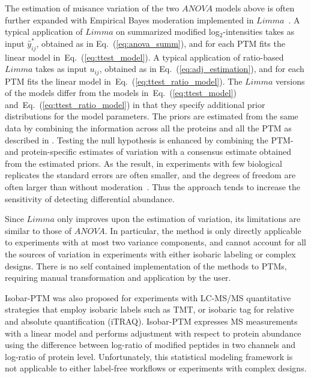 \documentclass[mcp]{article}
\numberwithin{table}{section}
\def\eqref#1{Eq.~(\ref{eq:#1})}
\begin{document}
\medskip \noindent The estimation of nuisance variation of the two $ANOVA$ models above is often further expanded with Empirical Bayes moderation implemented in $Limma$~\cite{ Ritchie_15a, Schwammle2015, Smyth:2004, Smyth:2005, Zhu,Chappell:2021}. 
A typical application of $Limma$ on summarized modified log$_2$-intensities takes as input $\hat{y}^*_{ij}$, obtained as in \eqref{anova_summ}, and for each PTM fits the linear model in~\eqref{ttest_model}. 
A typical application of ratio-based $Limma$ takes as input $u_{ij}$, obtained as in \eqref{adj_estimation}, and for each PTM fits the linear model in~\eqref{ttest_ratio_model}. 
The $Limma$ versions of the models differ from the models in~\eqref{ttest_model} and~\eqref{ttest_ratio_model} in that they specify additional prior distributions for the model parameters. 
The priors are estimated from the same data by combining the information across all the proteins and all the PTM as described in \cite{Smyth:2004}. 
Testing the null hypothesis is enhanced by combining the PTM- and protein-specific estimates of variation with a consensus estimate obtained from the estimated priors.
As the result, in experiments with few biological replicates the standard errors are often smaller, and the degrees of freedom are often larger than without moderation~\cite{Ritchie_15a}. 
Thus the approach tends to increase the sensitivity of detecting differential abundance.

Since $Limma$ only improves upon the estimation of variation, its limitations are similar to those of $ANOVA$. In particular, the method is only directly applicable to experiments with at most two variance components, and cannot account for all the sources of variation in experiments with either isobaric labeling or complex designs. There is no self contained implementation of the methods to PTMs, requiring manual transformation and application by the user.

\medskip {} 

\medskip \noindent Isobar-PTM was also proposed for experiments with LC-MS/MS quantitative strategies that employ isobaric labels such as TMT, or isobaric tag for relative and absolute quantification (iTRAQ)\cite{Breitwieser:2013}. Isobar-PTM expresses MS measurements with a linear model and performs adjustment with respect to protein abundance using the difference between log-ratio of modified peptides in two channels and log-ratio of protein level. Unfortunately, this statistical modeling framework is not applicable to either label-free workflows or experiments with complex designs. 
\end{document}
